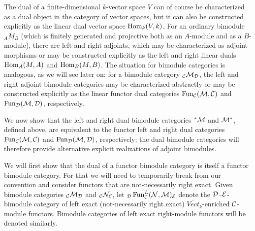 \documentclass{amsart}
\begin{document}
The dual of a finite-dimensional $k$-vector space $V$ can of course be characterized as a dual object in the category of vector spaces, but it can also be constructed explicitly as the linear dual vector space $\operatorname{Hom}_k(V,k)$.  For an ordinary bimodule ${}_A M_B$ (which is finitely generated and projective both as an $A$-module and as a $B$-module), there are left and right adjoints, which may be characterized as adjoint morphisms or may be constructed explicitly as the left and right linear duals $\operatorname{Hom}_A(M,A)$ and $\operatorname{Hom}_B(M,B)$.  The situation for bimodule categories is analogous, as we will see later on: for a bimodule category ${}_\mathcal C \mathcal M_\mathcal D$, the left and right adjoint bimodule categories may be characterized abstractly or may be constructed explicitly as the linear functor dual categories $\operatorname{Fun}_\mathcal C(\mathcal M,\mathcal C)$ and $\operatorname{Fun}_\mathcal D(\mathcal M,\mathcal D)$, respectively.  

We now show that the left and right dual bimodule categories ${}^* \mathcal M$ and $\mathcal M^*$, defined above, are equivalent to the functor left and right dual categories $\operatorname{Fun}_\mathcal C(\mathcal M,\mathcal C)$ and $\operatorname{Fun}_\mathcal D(\mathcal M,\mathcal D)$, respectively; the dual bimodule categories will therefore provide alternative explicit realizations of adjoint bimodules.

We will first show that the dual of a functor bimodule category is itself a functor bimodule category.  For that we will need to temporarily break from our convention and consider functors that are not-necessarily right exact.  Given bimodule categories ${}_\mathcal C \mathcal M_\mathcal D$ and ${}_{\mathcal C} \mathcal N_{\mathcal E}$, let ${}_{\mathcal D} \operatorname{Fun}^L_{\mathcal C}(\mathcal N,\mathcal M)_{\mathcal E}$ denote the $\mathcal D$--$\mathcal E$-bimodule category of left exact (not-necessarily right exact) $\overline{Vect}_k$-enriched $\mathcal C$-module functors.  Bimodule categories of left exact right-module functors will be denoted similarly.
\end{document}
